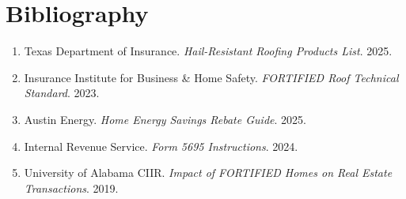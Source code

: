 \documentclass[11pt]{article}
\begin{document}
\section*{Bibliography}
\begin{enumerate}
    \item Texas Department of Insurance. \textit{Hail-Resistant Roofing Products List}. 2025.  
    \item Insurance Institute for Business \& Home Safety. \textit{FORTIFIED Roof Technical Standard}. 2023.  
    \item Austin Energy. \textit{Home Energy Savings Rebate Guide}. 2025.  
    \item Internal Revenue Service. \textit{Form 5695 Instructions}. 2024.  
    \item University of Alabama CIIR. \textit{Impact of FORTIFIED Homes on Real Estate Transactions}. 2019.  
\end{enumerate}
\end{document}
